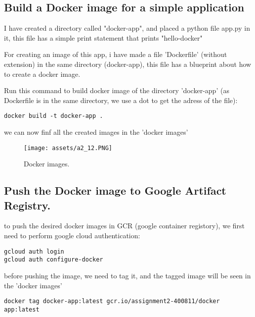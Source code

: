 \documentclass[12pt]{article}
\begin{document}
\subsection{Build a Docker image for a simple application}

I have created a directory called "docker-app", and placed a python file app.py in it, this file has a simple print statement that prints "hello-docker"

For creating an image of this app, i have made a file 'Dockerfile' (without extension) in the same directory (docker-app), this file has a blueprint about how to create a docker image.

Run this command to build docker image of the directory 'docker-app' (as Dockerfile is in the same directory, we use a dot to get the adress of the file):
\begin{listing}[H]
\begin{verbatim}
docker build -t docker-app .
\end{verbatim}
\end{listing}

we can now finf all the created images in the 'docker images'

\begin{figure}[H]
    \centering
    \texttt{[image: assets/a2\_12.PNG]}
    \caption{Docker images.}
    \label{fig:logo}
\end{figure}

\subsection{Push the Docker image to Google Artifact Registry.}

to push the desired docker images in GCR (google container registory), we first need to perform google cloud authentication:

\begin{listing}[htbp]
\begin{verbatim}
gcloud auth login
gcloud auth configure-docker
\end{verbatim}
\end{listing}
before pushing the image, we need to tag it, and the tagged image will be seen in the 'docker images'

\begin{listing}[htbp]
\begin{verbatim}
docker tag docker-app:latest gcr.io/assignment2-400811/docker
app:latest
\end{verbatim}
\end{listing}
\end{document}
